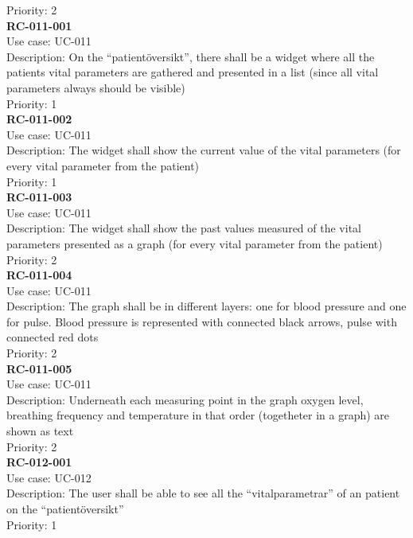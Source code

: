 Priority: 2 \\
\newline
\textbf{RC-011-001} \\
Use case: UC-011 \\
Description: On the “patientöversikt”, there shall be a widget where all the patients vital parameters are gathered and presented in a list (since all vital parameters always should be visible) \\
Priority: 1 \\
\newline
\textbf{RC-011-002} \\
Use case: UC-011 \\
Description: The widget shall show the current value of the vital parameters (for every vital parameter from the patient) \\
Priority: 1 \\
\newline
\textbf{RC-011-003} \\
Use case: UC-011 \\
Description: The widget shall show the past values measured of the vital parameters presented as a graph (for every vital parameter from the patient) \\
Priority: 2 \\
\newline
\textbf{RC-011-004} \\
Use case: UC-011 \\
Description: The graph shall be in different layers: one for blood pressure and one for pulse. Blood pressure is represented with connected black arrows, pulse with connected red dots \\
Priority: 2 \\
\newline
\textbf{RC-011-005} \\
Use case: UC-011 \\
Description: Underneath each measuring point in the graph oxygen level, breathing frequency and temperature in that order (togetheter in a graph) are shown as text\\
Priority: 2 \\
\newline
\textbf{RC-012-001} \\
Use case: UC-012 \\
Description: The user shall be able to see all the “vitalparametrar” of an patient on the “patientöversikt”  \\
Priority: 1 \\
\newline
